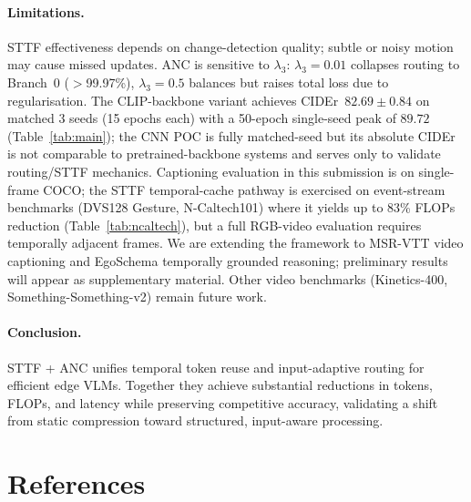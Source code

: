 \documentclass{article}
\begin{document}
\paragraph{Limitations.}
STTF effectiveness depends on change-detection quality; subtle or noisy motion may cause missed updates. ANC is sensitive to $\lambda_3$: $\lambda_3{=}0.01$ collapses routing to Branch~0 ($>$99.97\%), $\lambda_3{=}0.5$ balances but raises total loss due to regularisation. The CLIP-backbone variant achieves CIDEr~$82.69 \pm 0.84$ on matched 3 seeds (15 epochs each) with a 50-epoch single-seed peak of $89.72$ (Table~\ref{tab:main}); the CNN POC is fully matched-seed but its absolute CIDEr is not comparable to pretrained-backbone systems and serves only to validate routing/STTF mechanics. Captioning evaluation in this submission is on single-frame COCO; the STTF temporal-cache pathway is exercised on event-stream benchmarks (DVS128 Gesture, N-Caltech101) where it yields up to 83\% FLOPs reduction (Table~\ref{tab:ncaltech}), but a full RGB-video evaluation requires temporally adjacent frames. We are extending the framework to MSR-VTT video captioning and EgoSchema temporally grounded reasoning; preliminary results will appear as supplementary material. Other video benchmarks (Kinetics-400, Something-Something-v2) remain future work.

\paragraph{Conclusion.}
STTF + ANC unifies temporal token reuse and input-adaptive routing for efficient edge VLMs. Together they achieve substantial reductions in tokens, FLOPs, and latency while preserving competitive accuracy, validating a shift from static compression toward structured, input-aware processing.


\section*{References}
\medskip
\end{document}
